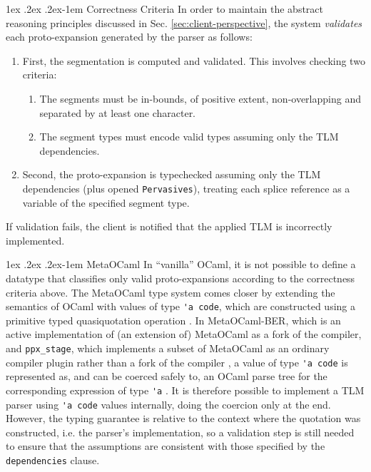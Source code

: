 \documentclass[acmsmall]{acmart}
\makeatletter
\renewcommand{\subsubsection}{%
  \@startsection{subsubsection}{3}%
  {\z@}{1ex \@plus .2ex \@minus .2ex}{-1em}%
  {\normalfont\normalsize\bfseries}%
}
\newcommand{\li}[1]{\lstinline[basicstyle=\ttfamily\fontsize{9pt}{1em}\selectfont]{#1}}
\makeatother
\begin{document}
\subsubsection{Correctness Criteria}
\label{sec:correctness-criteria}
In order to maintain the abstract reasoning principles discussed in Sec. \ref{sec:client-perspective}, the system \emph{validates} each proto-expansion generated by the parser as follows:
\begin{enumerate}
  \item First, the segmentation is computed and validated. This involves checking two criteria:
    \begin{enumerate}
      \item The segments must be in-bounds, of positive extent, non-overlapping and separated by at least one character.
      \item The segment types must encode valid types assuming only the TLM dependencies.
    \end{enumerate}
  \item Second, the proto-expansion is typechecked assuming only the TLM dependencies (plus opened \li{Pervasives}), treating each splice reference as a variable of the specified segment type.
\end{enumerate}
If validation fails, the client is notified that the applied TLM is incorrectly implemented.%

\subsubsection{MetaOCaml}\label{sec:metaocaml} In ``vanilla'' OCaml, it is not possible to define a datatype that classifies only valid proto-expansions according to the correctness criteria above. The MetaOCaml type system comes closer by extending the semantics of OCaml with values of type \li{'a code}, which are constructed using a primitive typed quasiquotation operation \cite{DBLP:conf/flops/Kiselyov14,taha2004gentle}. In MetaOCaml-BER, which is an active implementation of (an extension of) MetaOCaml as a fork of the compiler, and \li{ppx_stage}, which implements a subset of MetaOCaml as an ordinary compiler plugin rather than a fork of the compiler \cite{ppxstage}, a value of type \li{'a code} is represented as, and can be coerced safely to, an OCaml parse tree for the corresponding expression of type \li{'a} \cite{DBLP:conf/flops/Kiselyov14}. It is therefore possible to implement a TLM parser using \li{'a code} values internally, doing the coercion only at the end. However, the typing guarantee is relative to the context where the quotation was constructed, i.e. the parser's implementation, so a validation step is still needed to ensure that the assumptions are consistent with those specified by the \li{dependencies} clause. 
\end{document}
